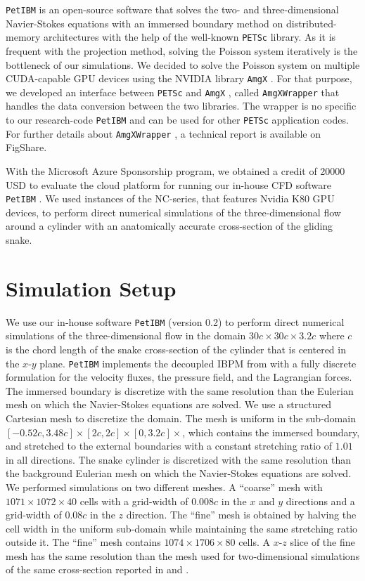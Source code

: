 \documentclass[12pt]{article}
\newcommand{\petibm}{\texttt{PetIBM} }
\newcommand{\petsc}{\texttt{PETSc} }
\newcommand{\amgx}{\texttt{AmgX} }
\newcommand{\amgxwrapper}{\texttt{AmgXWrapper} }
\begin{document}
\petibm is an open-source software that solves the two- and three-dimensional Navier-Stokes equations with an immersed boundary method on distributed-memory architectures with the help of the well-known \petsc library\cite{PETSc_webpage_2017,PETSc_users_manual_2017,Balay_et_al_1997}.
As it is frequent with the projection method, solving the Poisson system iteratively is the bottleneck of our simulations.
We decided to solve the Poisson system on multiple CUDA-capable GPU devices using the NVIDIA library \amgx\cite{Naumov_et_al_2015, Nvidia_AmgX_webpage}.
For that purpose, we developed an interface between \petsc and \amgx, called \amgxwrapper\cite{Chuang_Barba_2017} that handles the data conversion between the two libraries.
The wrapper is no specific to our research-code \petibm and can be used for other \petsc application codes.
For further details about \amgxwrapper, a technical report is available on FigShare\cite{Chuang_Barba_2017_b}.

With the Microsoft Azure Sponsorship program, we obtained a credit of 20000 USD to evaluate the cloud platform for running our in-house CFD software \petibm.
We used instances of the NC-series, that features Nvidia K80 GPU devices, to perform direct numerical simulations of the three-dimensional flow around a cylinder with an anatomically accurate cross-section of the gliding snake.


\section{Simulation Setup}

We use our in-house software \petibm (version 0.2) to perform direct numerical simulations of the three-dimensional flow in the domain $30c \times 30c \times 3.2c$ where $c$ is the chord length of the snake cross-section of the cylinder that is centered in the $x$-$y$ plane.
\petibm implements the decoupled IBPM from \cite{Li_et_al_2016} with a fully discrete formulation for the velocity fluxes, the pressure field, and the Lagrangian forces.
The immersed boundary is discretize with the same resolution than the Eulerian mesh on which the Navier-Stokes equations are solved.
We use a structured Cartesian mesh to discretize the domain.
The mesh is uniform in the sub-domain $\left[-0.52c, 3.48c\right]\times\left[2c, 2c\right]\times\left[0, 3.2c\right]\times$, which contains the immersed boundary, and stretched to the external boundaries with a constant stretching ratio of $1.01$ in all directions.
The snake cylinder is discretized with the same resolution than the background Eulerian mesh on which the Navier-Stokes equations are solved.
We performed simulations on two different meshes.
A ``coarse'' mesh with $1071\times1072\times40$ cells with a grid-width of $0.008c$ in the $x$ and $y$ directions and a grid-width of $0.08c$ in the $z$ direction.
The ``fine'' mesh is obtained by halving the cell width in the uniform sub-domain while maintaining the same stretching ratio outside it.
The ``fine'' mesh contains $1074\times1706\times80$ cells.
A $x$-$z$ slice of the fine mesh has the same resolution than the mesh used for two-dimensional simulations of the same cross-section reported in \cite{Krishnan_et_al_2014} and \cite{Mesnard_Barba_2017}.
\end{document}
